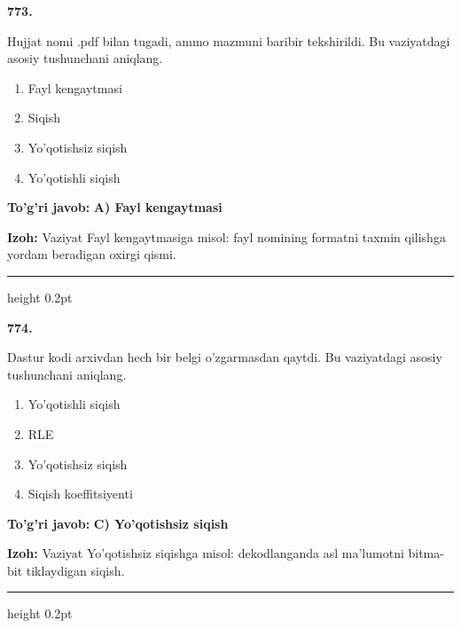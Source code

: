 \documentclass[10pt,a4paper,oneside]{article}
\begin{document}
\noindent\textbf{\color{ink}773.}
\par
Hujjat nomi .pdf bilan tugadi, ammo mazmuni baribir tekshirildi. Bu vaziyatdagi asosiy tushunchani aniqlang.
\begin{enumerate}[label=\Alph*),leftmargin=9mm]
\item Fayl kengaytmasi
\item Siqish
\item Yo'qotishsiz siqish
\item Yo'qotishli siqish
\end{enumerate}
\begin{tcolorbox}[enhanced,breakable,colback=teal!4,colframe=teal!50!black,boxrule=0.5pt,arc=1.1mm,left=3mm,right=3mm,top=1.7mm,bottom=1.7mm,before skip=2mm,after skip=2mm]
\textbf{\color{teal}To'g'ri javob:} \textbf{A) Fayl kengaytmasi}
\par\smallskip
\textbf{Izoh:} Vaziyat Fayl kengaytmasiga misol: fayl nomining formatni taxmin qilishga yordam beradigan oxirgi qismi.
\end{tcolorbox}
\vspace{2mm}\hrule height 0.2pt \vspace{3mm}

\noindent\textbf{\color{ink}774.}
\par
Dastur kodi arxivdan hech bir belgi o'zgarmasdan qaytdi. Bu vaziyatdagi asosiy tushunchani aniqlang.
\begin{enumerate}[label=\Alph*),leftmargin=9mm]
\item Yo'qotishli siqish
\item RLE
\item Yo'qotishsiz siqish
\item Siqish koeffitsiyenti
\end{enumerate}
\begin{tcolorbox}[enhanced,breakable,colback=teal!4,colframe=teal!50!black,boxrule=0.5pt,arc=1.1mm,left=3mm,right=3mm,top=1.7mm,bottom=1.7mm,before skip=2mm,after skip=2mm]
\textbf{\color{teal}To'g'ri javob:} \textbf{C) Yo'qotishsiz siqish}
\par\smallskip
\textbf{Izoh:} Vaziyat Yo'qotishsiz siqishga misol: dekodlanganda asl ma'lumotni bitma-bit tiklaydigan siqish.
\end{tcolorbox}
\vspace{2mm}\hrule height 0.2pt \vspace{3mm}
\end{document}
